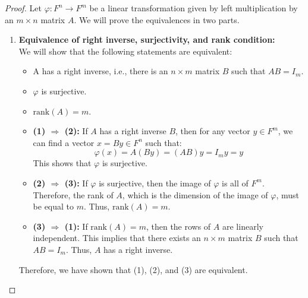 \documentclass[openany]{book}
\begin{document}
\begin{proof}
Let $\varphi: F^n \to F^m$ be a linear transformation given by left multiplication by an $m \times n$ matrix $A$. We will prove the equivalences in two parts.
\begin{enumerate}
    \item \textbf{Equivalence of right inverse, surjectivity, and rank condition:} \\
    We will show that the following statements are equivalent:
    \begin{itemize}
        \item A has a right inverse, i.e., there is an $n \times m$ matrix $B$ such that $AB = I_m$.
        \item $\varphi$ is surjective.
        \item $\text{rank}(A) = m$.
    \end{itemize}
    \begin{itemize}
        \item \textbf{(1) $\Rightarrow$ (2):} If $A$ has a right inverse $B$, then for any vector $y \in F^m$, we can find a vector $x = By \in F^n$ such that:
        $$\varphi(x) = A(By) = (AB)y = I_my = y$$
        This shows that $\varphi$ is surjective.
        \item \textbf{(2) $\Rightarrow$ (3):} If $\varphi$ is surjective, then the image of $\varphi$ is all of $F^m$. Therefore, the rank of $A$, which is the dimension of the image of $\varphi$, must be equal to $m$. Thus, $\text{rank}(A) = m$.
        \item \textbf{(3) $\Rightarrow$ (1):} If $\text{rank}(A) = m$, then the rows of $A$ are linearly independent. This implies that there exists an $n \times m$ matrix $B$ such that $AB = I_m$. Thus, $A$ has a right inverse.
    \end{itemize}
    Therefore, we have shown that (1), (2), and (3) are equivalent.
    

\end{enumerate}
\end{proof}
\end{document}
